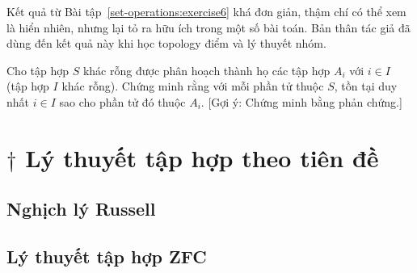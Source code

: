 Kết quả từ Bài tập~\ref{set-operations:exercise6} khá đơn giản, thậm chí có thể xem là hiển nhiên, nhưng lại tỏ ra hữu ích trong một số bài toán. Bản thân tác giả đã dùng đến kết quả này khi học topology điểm và lý thuyết nhóm.

\begin{exercise}\label{set-operations:exercise7}
    Cho tập hợp $S$ khác rỗng được phân hoạch thành họ các tập hợp $A_{i}$ với $i\in I$ (tập hợp $I$ khác rỗng). Chứng minh rằng với mỗi phần tử thuộc $S$, tồn tại duy nhất $i\in I$ sao cho phần tử đó thuộc $A_{i}$. [Gợi ý: Chứng minh bằng phản chứng.]
\end{exercise}


\section{$\dagger$ Lý thuyết tập hợp theo tiên đề}\label{section5:axiomatic-set-theory}

\subsection{Nghịch lý Russell}

\subsection{Lý thuyết tập hợp ZFC}
